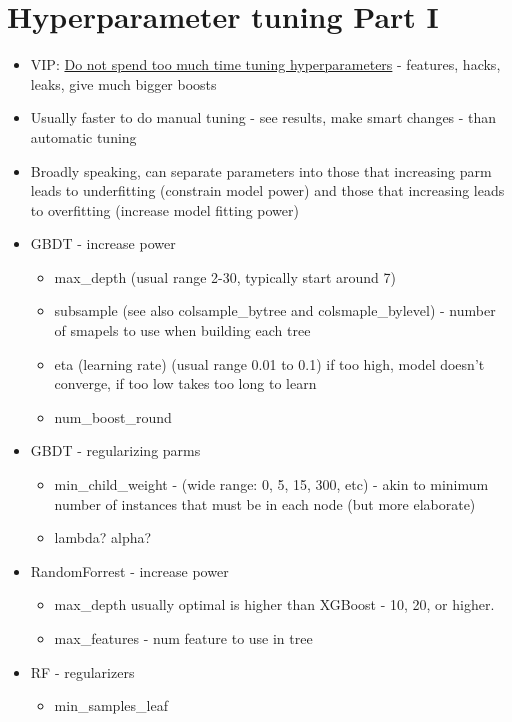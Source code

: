\documentclass[a4paper]{report}
\begin{document}
\section{Hyperparameter tuning Part I}
\begin{itemize}
  \item VIP: \underline{Do not spend too much time tuning hyperparameters} - features, hacks, leaks, give much bigger boosts
  \item Usually faster to do manual tuning - see results, make smart changes - than automatic tuning
  \item Broadly speaking, can separate parameters into those that increasing parm leads to underfitting (constrain model power) and those that increasing leads to overfitting (increase model fitting power)
  \item GBDT - increase power
  \begin{itemize}
    \item max\_depth (usual range 2-30, typically start around 7)
    \item subsample (see also colsample\_bytree and colsmaple\_bylevel) - number of smapels to use when building each tree
    \item eta (learning rate) (usual range 0.01 to 0.1)
      \subitem if too high, model doesn't converge, if too low takes too long to learn
    \item num\_boost\_round
  \end{itemize}
\item GBDT - regularizing parms
  \begin{itemize}
    \item min\_child\_weight - (wide range: 0, 5, 15, 300, etc) - akin to minimum number of instances that must be in each node (but more elaborate)
    \item lambda? alpha?
  \end{itemize}
\item RandomForrest - increase power
  \begin{itemize}
    \item max\_depth  
      \subitem usually optimal is higher than XGBoost	- 10, 20, or higher.
    \item max\_features - num feature to use in tree
  \end{itemize}
\item RF - regularizers
  \begin{itemize}
    \item min\_samples\_leaf

\end{itemize}
\end{itemize}
\end{document}
